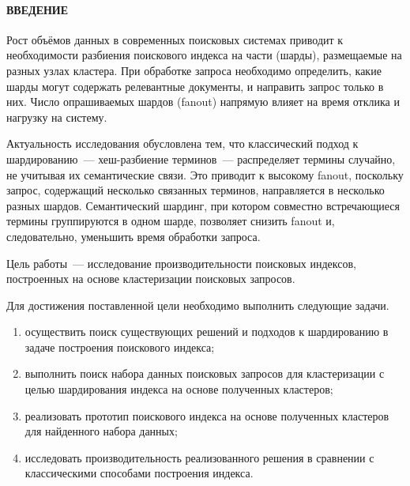 \documentclass[14pt, a4paper]{article}
\newcommand{\reportheader}[1]{%
	\phantomsection%
	\clearpage
	\paragraph*{{#1}}%
	\addcontentsline{toc}{section}{#1}%
}
\begin{document}
	

	\tableofcontents
	\clearpage
	\reportheader{ВВЕДЕНИЕ}

	Рост объёмов данных в современных поисковых системах приводит к необходимости разбиения поискового индекса на части (шарды), размещаемые на разных узлах кластера.
	При обработке запроса необходимо определить, какие шарды могут содержать релевантные документы, и направить запрос только в них.
	Число опрашиваемых шардов (fanout) напрямую влияет на время отклика и нагрузку на систему.

	Актуальность исследования обусловлена тем, что классический подход к шардированию~--- хеш-разбиение терминов~--- распределяет термины случайно, не учитывая их семантические связи.
	Это приводит к высокому fanout, поскольку запрос, содержащий несколько связанных терминов, направляется в несколько разных шардов.
	Семантический шардинг, при котором совместно встречающиеся термины группируются в одном шарде, позволяет снизить fanout и, следовательно, уменьшить время обработки запроса.

	Цель работы~--- исследование производительности поисковых индексов, построенных на основе кластеризации поисковых запросов.

	Для достижения поставленной цели необходимо выполнить следующие задачи.
	\begin{enumerate}
		\item осуществить поиск существующих решений и подходов к шардированию в задаче построения поискового индекса;
		\item выполнить поиск набора данных поисковых запросов для кластеризации с целью шардирования индекса на основе полученных кластеров;
		\item реализовать прототип поискового индекса на основе полученных кластеров для найденного набора данных;
		\item исследовать производительность реализованного решения в сравнении с классическими способами построения индекса.
	\end{enumerate}
\end{document}

